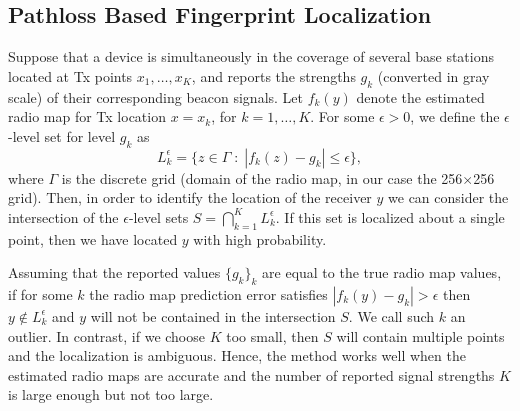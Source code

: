 \documentclass[10pt,a4paper]{article}
\begin{document}


\subsection{Pathloss Based Fingerprint Localization}
\label{Pathloss Based Fingerprint Localization}

Suppose that a device is simultaneously in the coverage of several base stations located at Tx points $x_1, \ldots, x_K$, and reports the strengths $g_k$ (converted in gray scale) of their corresponding beacon signals. Let $f_k(y)$ denote the estimated radio map for Tx location $x = x_k$, for $k = 1, \ldots, K$. For some $\epsilon > 0$, we define the $\epsilon$-level set for level $g_k$ as
\begin{equation} \label{levelset}
L^\epsilon_k = \{ z \in \Gamma \; : \;  |f_k(z) - g_k| \leq \epsilon \},
\end{equation}
where $\Gamma$ is the discrete grid (domain of the radio map, in our case the 256$\times$256 grid). 
Then, in order to identify the location of the receiver $y$ we can consider the intersection of the $\epsilon$-level sets
$S = \bigcap_{k=1}^K L^\epsilon_k$. If this set is localized about a single point, then we have located $y$ %
 with high probability. 

Assuming that the reported values $\{g_k\}_k$ are equal to the true radio map values, if for some $k$ the radio map prediction error satisfies $|f_k(y) - g_k| > \epsilon$ then $y \notin L^\epsilon_k$ and $y$ will not be contained in the intersection $S$. We call such $k$ an outlier.
In contrast, if we choose $K$ too small, then $S$ will contain multiple points and the localization is ambiguous. 
Hence, the method works well when the estimated radio maps are accurate and the number of reported signal strengths $K$ is large enough but not too large. 
\end{document}
